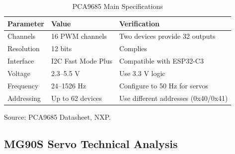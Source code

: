 \documentclass[lettersize,journal]{IEEEtran}
\begin{document}
	
	\begin{table}[H]
		\centering
		\caption{PCA9685 Main Specifications}
		\scriptsize
		
		\setlength{\tabcolsep}{2pt}
		\renewcommand{\arraystretch}{1.05}
		
		\begin{tabularx}{\columnwidth}
			{@{}P{2cm} P{2.2cm} Y@{}}
			
			\toprule
			Parameter & Value & Verification\\
			\midrule
			
			Channels &
			16 PWM channels &
			Two devices provide 32 outputs \\
			
			Resolution &
			12 bits &
			Complies \\
			
			Interface &
			I2C Fast Mode Plus &
			Compatible with ESP32-C3 \\
			
			Voltage &
			2.3--5.5 V &
			Use 3.3 V logic \\
			
			Frequency &
			24--1526 Hz &
			Configure to 50 Hz for servos \\
			
			Addressing &
			Up to 62 devices &
			Use different addresses (0x40/0x41) \\
			
			\bottomrule
			
		\end{tabularx}
		
	\end{table}
	
	
	Source: PCA9685 Datasheet, NXP. \cite{pca9685}
	
	
	\subsection{MG90S Servo Technical Analysis}
	
\end{document}
